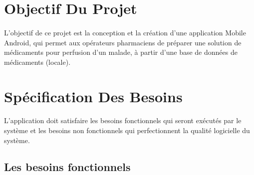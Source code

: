 \documentclass[12pt, openany]{report}
\begin{document}
\section{Objectif Du Projet}
\paragraph{}L’objectif de ce projet est la conception et la création d’une application Mobile Android, qui permet aux opérateurs pharmaciens de préparer une solution de médicaments pour perfusion d'un malade, à partir d'une base de données de médicaments (locale).
\section{Spécification Des Besoins}
\paragraph{} L’application doit satisfaire les besoins fonctionnels qui seront exécutés par le système et les besoins non fonctionnels qui perfectionnent la qualité logicielle du système.
\subsection{Les besoins fonctionnels}
\end{document}
